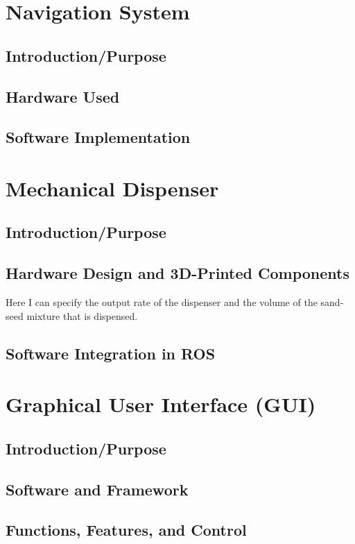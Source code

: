 \section{Navigation System}
\subsection{Introduction/Purpose}
\subsection{Hardware Used}
\subsection{Software Implementation}

\section{Mechanical Dispenser}
\subsection{Introduction/Purpose}
\subsection{Hardware Design and 3D-Printed Components}
Here I can specify the output rate of the dispenser and the volume of the sand-seed mixture that is dispensed.
\subsection{Software Integration in ROS}

\section{Graphical User Interface (GUI)}
\subsection{Introduction/Purpose}
\subsection{Software and Framework}
\subsection{Functions, Features, and Control}

